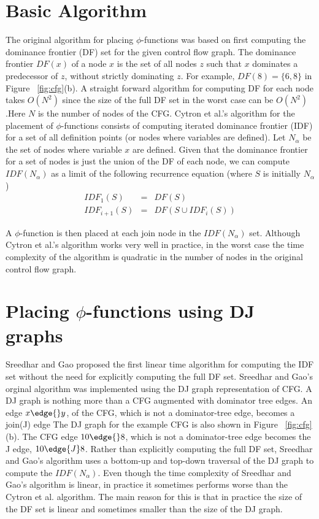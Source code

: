 \section{Basic Algorithm}
The original algorithm for placing $\phi$-functions
was based on first computing the dominance frontier  (DF) set for the given control flow graph.
The dominance frontier $DF(x)$ of a node $x$ is the set of all nodes 
 $z$ such that $x$ dominates a predecessor of $z$, without strictly dominating $z$.
For example, $DF(8)= \{ 6, 8 \}$ in Figure ~\ref{fig:cfg}(b). A straight forward algorithm for computing
DF for each node takes $O(N^2)$ since the size of the full DF set in the worst case
can be $O(N^2)$.Here $N$ is the number of nodes of the CFG. 
Cytron et al.'s algorithm for the placement of $\phi$-functions consists of computing
iterated dominance frontier (IDF) for a set of all definition points (or nodes where
variables are defined). 
Let $N_{\alpha}$ be the set of nodes where variable $x$ are  defined.
Given that the dominance frontier for a set of nodes is just the
union of the DF of each node, we can compute $IDF(N_\alpha)$ as a limit of
the following recurrence equation (where $S$ is initially $N_\alpha$)
\begin{eqnarray*}
IDF_1(S) &=& DF(S) \\
IDF_{i+1} (S) &=& DF(S \cup IDF_i(S)) 
\end{eqnarray*}

A $\phi$-function is then placed at each join node in the  $IDF(N_{\alpha})$ set. 
Although Cytron et al.'s
algorithm works very well in practice, in the worst case the time complexity of the
algorithm is quadratic in the number of nodes in the original control flow graph.




\section{Placing $\phi$-functions using DJ graphs}
Sreedhar and Gao 
proposed the first linear time algorithm for computing the IDF set without
the need for explicitly computing the full DF set. Sreedhar and Gao's orginal
algorithm was implemented using the DJ graph representation of CFG. A DJ graph
is nothing more than a CFG augmented with dominator tree edges. An edge $x \edge{} y$, of the
CFG, which is not a dominator-tree edge, becomes a join(J) edge The
DJ graph for the example CFG is also shown in Figure ~\ref{fig:cfg}(b). The CFG edge
$10 \edge{} 8$, which is not a dominator-tree edge becomes the J edge, $10 \edge{J} 8$.
Rather than explicitly
computing the full DF set, Sreedhar and Gao's algorithm uses a bottom-up and top-down
traversal of the DJ graph to compute the  $IDF(N_{\alpha})$. Even though
 the time complexity of
Sreedhar and Gao's algorithm is linear, in practice it sometimes performs worse than the Cytron et al.
algorithm. The main reason for this is that in practice the size of the DF set is linear 
and sometimes smaller than the size of the DJ graph. 


